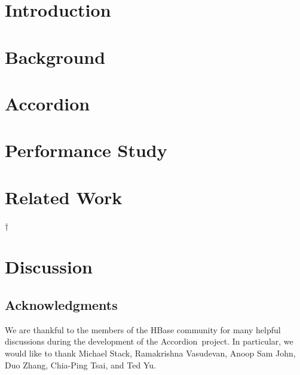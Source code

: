 \documentclass{vldb}
\newcommand{\sys}{Accordion}
\begin{document}

\section{Introduction} \label{sec:intro}
 

\section{Background} \label{sec:background}
 

\section{\sys} \label{sec:accordion}
 

\section{Performance Study} \label{sec:eval}



\section{Related Work} \label{sec:related}
†

\section{Discussion} \label{sec:conclusions}


\subsection*{Acknowledgments}

We are thankful to the members of the HBase community for many helpful discussions during the development of the \sys\ project. In particular, we would like to thank Michael Stack, Ramakrishna Vasudevan, Anoop Sam John, Duo Zhang, Chia-Ping Tsai, and Ted Yu.





\end{document}
